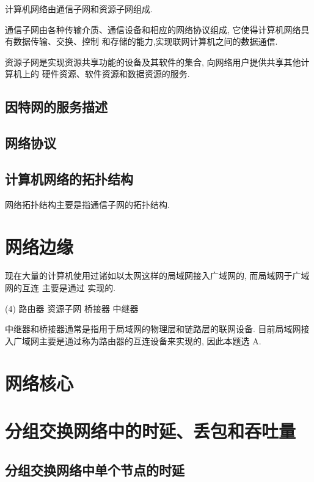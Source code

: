 \documentclass[10pt,UTF8]{book} %
\begin{document}
计算机网络由通信子网和资源子网组成.

通信子网由各种传输介质、通信设备和相应的网络协议组成, 它使得计算机网络具有数据传输、交换、控制
和存储的能力,实现联网计算机之间的数据通信.

资源子网是实现资源共享功能的设备及其软件的集合, 向网络用户提供共享其他计算机上的
硬件资源、软件资源和数据资源的服务.
\subsection{因特网的服务描述}
\subsection{网络协议}

\subsection{计算机网络的拓扑结构}

网络拓扑结构主要是指通信子网的拓扑结构.

\section{网络边缘}

\begin{example}
    现在大量的计算机使用过诸如以太网这样的局域网接入广域网的, 而局域网于广域网的互连
    主要是通过 \underline{\qquad \qquad \qquad} 实现的.
    \begin{tasks}[label={\Alph*.}](4)
        \task 路由器
        \task 资源子网
        \task 桥接器
        \task 中继器
    \end{tasks}
    \begin{cmt}
        中继器和桥接器通常是指用于局域网的物理层和链路层的联网设备.
        目前局域网接入广域网主要是通过称为路由器的互连设备来实现的, 因此本题选 A.
    \end{cmt}
\end{example}

\section{网络核心}

\newpage
\section{分组交换网络中的时延、丢包和吞吐量}

\subsection{分组交换网络中单个节点的时延}
\end{document}
